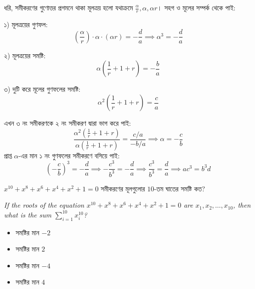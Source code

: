 \documentclass[12pt, a4paper]{article}
\begin{document}
\begin{tcolorbox}[solutionbox={সমাধান (Solution)}]
    \noindent
    ধরি, সমীকরণের গুণোত্তর প্রগমনে থাকা মূলত্রয় হলো যথাক্রমে $\frac{\alpha}{r}, \alpha, \alpha r$। সহগ ও মূলের সম্পর্ক থেকে পাই:
    
    \vspace{0.5em}
    ১) মূলত্রয়ের গুণফল:
    \[ \left(\frac{\alpha}{r}\right) \cdot \alpha \cdot (\alpha r) = -\frac{d}{a} \implies \alpha^3 = -\frac{d}{a} \]
    
    \vspace{0.5em}
    ২) মূলত্রয়ের সমষ্টি:
    \[ \alpha\left(\frac{1}{r} + 1 + r\right) = -\frac{b}{a} \]
    
    \vspace{0.5em}
    ৩) দুটি করে মূলের গুণফলের সমষ্টি:
    \[ \alpha^2\left(\frac{1}{r} + 1 + r\right) = \frac{c}{a} \]
    
    \vspace{0.5em}
    এখন ৩ নং সমীকরণকে ২ নং সমীকরণ দ্বারা ভাগ করে পাই:
    \[ \frac{\alpha^2\left(\frac{1}{r} + 1 + r\right)}{\alpha\left(\frac{1}{r} + 1 + r\right)} = \frac{c/a}{-b/a} \implies \alpha = -\frac{c}{b} \]
    প্রাপ্ত $\alpha$-এর মান ১ নং গুণফলের সমীকরণে বসিয়ে পাই:
    \[ \left(-\frac{c}{b}\right)^3 = -\frac{d}{a} \implies -\frac{c^3}{b^3} = -\frac{d}{a} \implies \frac{c^3}{b^3} = \frac{d}{a} \implies ac^3 = b^3 d \]
\end{tcolorbox}
\begin{tcolorbox}[questionbox={প্রশ্ন (Question) 45}]
    \noindent
    $x^{10} + x^8 + x^6 + x^4 + x^2 + 1 = 0$ সমীকরণের মূলগুলোর $10$-তম ঘাতের সমষ্টি কত?
    
    \vspace{0.8em}
    \begin{english}
    \noindent\textit{\color{darkgray}
    If the roots of the equation $x^{10} + x^8 + x^6 + x^4 + x^2 + 1 = 0$ are $x_1, x_2, \dots, x_{10}$, then what is the sum $\sum_{i=1}^{10} x_i^{10}$?
    }
    \end{english}
\end{tcolorbox}

\begin{itemize}[label={}, leftmargin=1cm, itemsep=0.5em]
    \item[\textbf{A)}] সমষ্টির মান $-2$
    \item[\textbf{B)}] সমষ্টির মান $2$
    \item[\textbf{C)}] সমষ্টির মান $-4$
    \item[\textbf{D)}] সমষ্টির মান $4$
\end{itemize}
\end{document}
